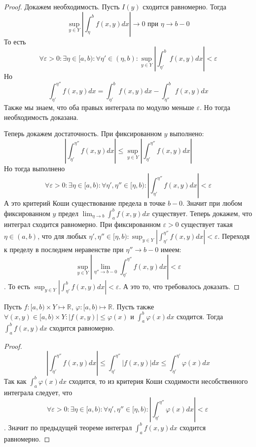 \documentclass[document.tex]{subfiles}
\begin{document}
\begin{proof}
    Докажем необходимость. Пусть $I(y)$ сходится равномерно. Тогда
    \[
        \sup_{y \in Y} \left| \int_{\eta}^{b}f(x, y)dx \right| \rightarrow 0 \text{ при } \eta \rightarrow b - 0
    \]
    То есть
    \[
        \forall \varepsilon > 0: \exists \eta \in [a, b): \forall \eta' \in (\eta, b): \sup_{y \in Y} \left| \int_{\eta'}^{b}f(x, y)dx
        \right| < \varepsilon
    \]
    Но
    \[
        \int_{\eta'}^{\eta''}f(x, y)dx = \int_{\eta'}^{b}f(x, y)dx - \int_{\eta''}^{b}f(x, y)dx
    \]
    Также мы знаем, что оба правых интеграла по модулю меньше $\varepsilon$. Но тогда необходимость доказана.

    Теперь докажем достаточность. При фиксированном $y$ выполнено:
    \[
        \left| \int_{\eta'}^{\eta''}f(x, y)dx \right| \leq \sup_{y \in Y} \left| \int_{\eta'}^{\eta''} f(x, y)dx \right|
    \]
    Но тогда выполнено
    \[
        \forall \varepsilon > 0: \exists \eta \in [a, b): \forall \eta', \eta'' \in [\eta, b): \left|
        \int_{\eta'}^{\eta''}f(x, y)dx \right| < \varepsilon
    \]
    А это критерий Коши существование предела в точке $b - 0$. Значит при любом фиксированном $y$ предел $\lim_{\eta
    \rightarrow b} \int_{a}^{b}f(x, y)dx$ существует. Теперь докажем, что интеграл сходится равномерно. При
    фиксированном $\varepsilon > 0$ существует такая $\eta \in (a, b)$, что для любых $\eta', \eta'' \in [\eta, b):
        \sup_{y \in Y} \left| \int_{\eta'}^{\eta''}f(x, y)dx \right| < \varepsilon$. Переходя к пределу в последнем неравенстве при
        $\eta'' \rightarrow b - 0$ имеем:
        \[
            \sup_{y \in Y} \left| \lim_{\eta'' \rightarrow b - 0}
            \int_{\eta'}^{\eta''}f(x, y)dx \right| < \varepsilon
        \]. То есть $\sup_{y \in Y} \left| \int_{\eta'}^{b} f(x, y)dx
        \right| < \varepsilon$. А это то, что требовалось доказать.
\end{proof}

\begin{theorem}
    Пусть $f : [a, b) \times Y \mapsto \mathbb{R}$, $\varphi: [a, b) \mapsto \mathbb{R}$. Пусть также $\forall (x, y)
    \in [a, b) \times Y: |f(x, y)| \leq \varphi(x)$ и $\int_{a}^{b}\varphi(x)dx$ сходится. Тогда
     $\int_{a}^{b}f(x, y)dx$ сходится равномерно.
\end{theorem}

\begin{proof}
    \[
        \left| \int_{\eta'}^{\eta''}f(x, y)dx \right| \leq \int_{\eta'}^{\eta''}|f(x, y)|dx \leq \int_{\eta'}^{\eta'}
        \varphi(x)dx
    \]
    Так как $\int_{a}^{b}\varphi(x)dx$ сходится, то из критерия Коши сходимости несобственного интеграла следует, что
    \[
        \forall \varepsilon > 0: \exists \eta \in [a, b): \forall \eta', \eta'' \in [\eta, b):
        \left|\int_{\eta'}^{\eta''}\varphi(x)dx \right| < \varepsilon\
    \]. Значит по предыдущей теореме интеграл $\int_{a}^{b}f(x, y)dx$ сходится равномерно.
\end{proof}
\end{document}
